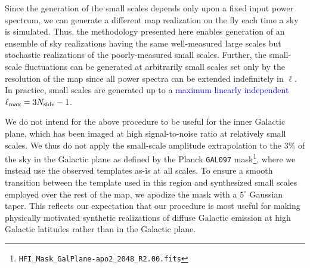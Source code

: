 \documentclass[twocolumn]{aastex631}
\newcommand{\af}[1]{\textcolor{blue}{#1}}
\begin{document}
Since the generation of the small scales depends only upon a fixed input power spectrum, we can generate a different map realization on the fly each time a sky is simulated. Thus, the methodology presented here enables generation of an ensemble of sky realizations having the same well-measured large scales but stochastic realizations of the poorly-measured small scales. Further, the small-scale fluctuations can be generated at arbitrarily small scales set only by the resolution of the map since all power spectra can be extended indefinitely in $\ell$. In practice, small scales are generated up to a \af{maximum linearly independent} $\ell_{\rm max} = 3N_{\rm side}-1$.

We do not intend for the above procedure to be useful for the inner Galactic plane, which has been imaged at high signal-to-noise ratio at relatively small scales. We thus do not apply the small-scale amplitude extrapolation to the $3\%$ of the sky in the Galactic plane as defined by the Planck \texttt{GAL097} mask\footnote{\texttt{HFI\_Mask\_GalPlane-apo2\_2048\_R2.00.fits}}, where we instead use the observed templates as-is at all scales. To ensure a smooth transition between the template used in this region and synthesized small scales employed over the rest of the map, we apodize the mask with a $5^\circ$ Gaussian taper. This reflects our expectation that our procedure is most useful for making physically motivated synthetic realizations of diffuse Galactic emission at high Galactic latitudes rather than in the Galactic plane.
\end{document}
